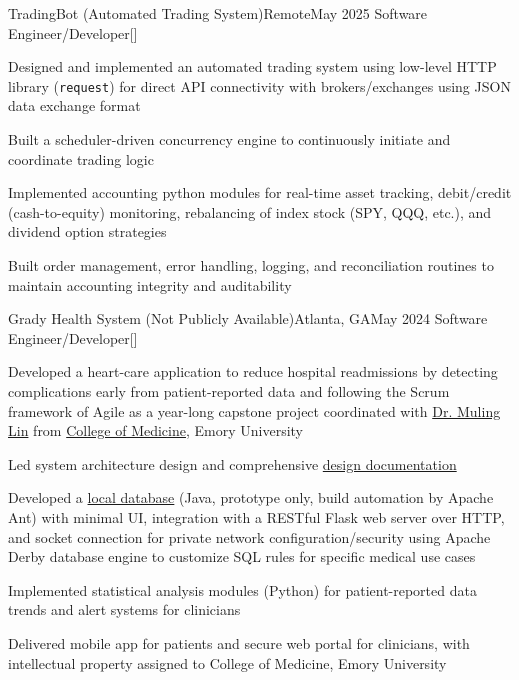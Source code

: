 \begin{resume-itemize}
  {TradingBot (Automated Trading System)}{Remote}{May 2025}
  {Software Engineer/Developer}[\href{https://github.com/YundaeLeeSong/ydjs-references/tree/main/project2505-app_tradingbot}{}]
  \item Designed and implemented an automated trading system using low-level HTTP library (\texttt{request}) 
  for direct API connectivity with brokers/exchanges using JSON data exchange format
  \item Built a scheduler-driven concurrency engine to continuously initiate and coordinate trading logic
  \item Implemented accounting python modules for real-time asset tracking, debit/credit (cash-to-equity) monitoring, 
  rebalancing of index stock (SPY, QQQ, etc.), and dividend option strategies
  \item Built order management, error handling, logging, and reconciliation routines 
  to maintain accounting integrity and auditability
\end{resume-itemize}
\begin{resume-itemize}
  {Grady Health System (Not Publicly Available)}{Atlanta, GA}{May 2024}
  {Software Engineer/Developer}[]
  \item Developed a heart-care application to reduce hospital readmissions by detecting complications early 
  from patient-reported data and following the Scrum framework of Agile as a year-long capstone project coordinated with 
  \href{https://www.doximity.com/pub/muling-lin-md-bec64b54}{Dr. Muling Lin} from 
  \href{https://med.emory.edu/departments/medicine/_documents/resident-photo-book-2022-2023.pdf}{College of Medicine}, Emory University
  \item Led system architecture design and comprehensive 
  \href{https://yundaeleesong.github.io/project2405-server_derbyDB-docs.pdf}{design documentation}
  \item Developed a \href{https://github.com/YundaeLeeSong/ydjs-references/tree/main/project2405-server_derbyDB}{local database}
  (Java, prototype only, build automation by Apache Ant) with minimal UI, integration with a RESTful Flask web server over HTTP, and socket connection for private network configuration/security 
  using Apache Derby database engine to customize SQL rules for specific medical use cases
  \item Implemented statistical analysis modules (Python) for patient-reported data trends 
  and alert systems for clinicians
  \item Delivered mobile app for patients and secure web portal for clinicians, 
  with intellectual property assigned to College of Medicine, Emory University
\end{resume-itemize}
